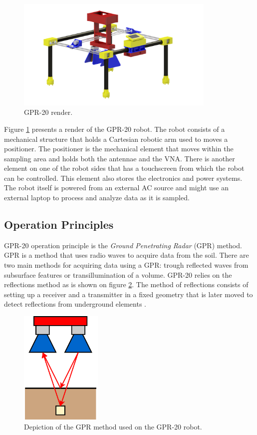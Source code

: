 \documentclass{article}
\begin{document}
\begin{figure}[ht]
    \centering
    \vspace{0.5cm}
    \includegraphics[width=0.85\textwidth]{images/full_mkII.png}
    \caption{GPR-20 render.}
    \label{fig:gpr-gpr20}
\end{figure}

Figure \ref{fig:gpr-gpr20} presents a render of the GPR-20 robot. The robot consists of a mechanical structure that holds a Cartesian robotic arm used to moves a positioner. The positioner is the mechanical element that moves within the sampling area and holds both the antennae and the VNA. There is another element on one of the robot sides that has a touchscreen from which the robot can be controlled. This element also stores the electronics and power systems. The robot itself is powered from an external AC source and might use an external laptop to process and analyze data as it is sampled. 

\subsection{Operation Principles}
GPR-20 operation principle is the \textit{Ground Penetrating Radar} (GPR) method. GPR is a method that uses radio waves to acquire data from the soil. There are two main methods for acquiring data using a GPR: trough reflected waves from subsurface features or transillumination of a volume. GPR-20 relies on the reflections method as is shown on figure \ref{fig:gpr-principle}. The method of reflections consists of setting up a receiver and a transmitter in a fixed geometry that is later moved to detect reflections from underground elements \cite{GPR_JOL}. 

\begin{figure}[ht]
    \centering
    \includegraphics[width=0.35\textwidth]{images/GPR_principles.pdf}
    \caption{Depiction of the GPR method used on the GPR-20 robot.}
    \label{fig:gpr-principle}
\end{figure}
\end{document}
